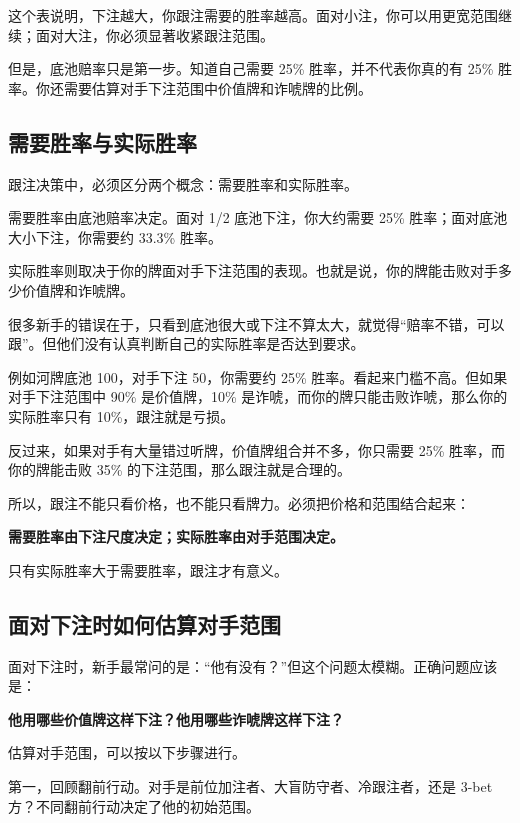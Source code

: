 这个表说明，下注越大，你跟注需要的胜率越高。面对小注，你可以用更宽范围继续；面对大注，你必须显著收紧跟注范围。

但是，底池赔率只是第一步。知道自己需要 25\% 胜率，并不代表你真的有 25\% 胜率。你还需要估算对手下注范围中价值牌和诈唬牌的比例。

\subsection{需要胜率与实际胜率}

跟注决策中，必须区分两个概念：需要胜率和实际胜率。

需要胜率由底池赔率决定。面对 1/2 底池下注，你大约需要 25\% 胜率；面对底池大小下注，你需要约 33.3\% 胜率。

实际胜率则取决于你的牌面对手下注范围的表现。也就是说，你的牌能击败对手多少价值牌和诈唬牌。

很多新手的错误在于，只看到底池很大或下注不算太大，就觉得“赔率不错，可以跟”。但他们没有认真判断自己的实际胜率是否达到要求。

例如河牌底池 100，对手下注 50，你需要约 25\% 胜率。看起来门槛不高。但如果对手下注范围中 90\% 是价值牌，10\% 是诈唬，而你的牌只能击败诈唬，那么你的实际胜率只有 10\%，跟注就是亏损。

反过来，如果对手有大量错过听牌，价值牌组合并不多，你只需要 25\% 胜率，而你的牌能击败 35\% 的下注范围，那么跟注就是合理的。

所以，跟注不能只看价格，也不能只看牌力。必须把价格和范围结合起来：

\begin{center}
\textbf{需要胜率由下注尺度决定；实际胜率由对手范围决定。}
\end{center}

只有实际胜率大于需要胜率，跟注才有意义。

\subsection{面对下注时如何估算对手范围}

面对下注时，新手最常问的是：“他有没有？”但这个问题太模糊。正确问题应该是：

\begin{center}
\textbf{他用哪些价值牌这样下注？他用哪些诈唬牌这样下注？}
\end{center}

估算对手范围，可以按以下步骤进行。

第一，回顾翻前行动。对手是前位加注者、大盲防守者、冷跟注者，还是 3-bet 方？不同翻前行动决定了他的初始范围。

